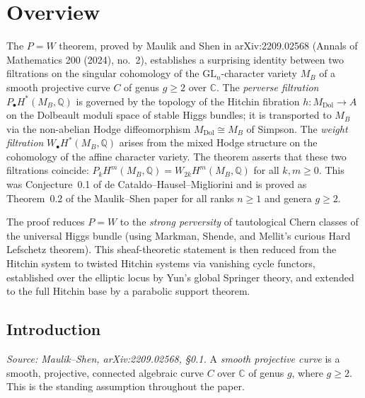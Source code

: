\chapter{Overview}
\label{chap:overview}


\providecommand{\git}{\mathbin{/\mkern-6mu/}}

The $P=W$ theorem, proved by Maulik and Shen in arXiv:2209.02568 (Annals of Mathematics 200
(2024), no.~2), establishes a surprising identity between two filtrations on the singular
cohomology of the $\mathrm{GL}_n$-character variety $M_B$ of a smooth projective curve $C$
of genus $g \geq 2$ over $\mathbb{C}$.  The \emph{perverse filtration}
$P_\bullet H^*(M_B, \mathbb{Q})$ is governed by the topology of the Hitchin fibration
$h \colon M_{\mathrm{Dol}} \to A$ on the Dolbeault moduli space of stable Higgs bundles; it
is transported to $M_B$ via the non-abelian Hodge diffeomorphism $M_{\mathrm{Dol}} \cong M_B$
of Simpson.  The \emph{weight filtration} $W_\bullet H^*(M_B, \mathbb{Q})$ arises from the
mixed Hodge structure on the cohomology of the affine character variety.  The theorem asserts
that these two filtrations coincide: $P_k H^m(M_B, \mathbb{Q}) = W_{2k} H^m(M_B, \mathbb{Q})$
for all $k, m \geq 0$.  This was Conjecture~0.1 of de Cataldo--Hausel--Migliorini and is
proved as Theorem~0.2 of the Maulik--Shen paper for all ranks $n \geq 1$ and genera $g \geq 2$.

The proof reduces $P=W$ to the \emph{strong perversity} of tautological Chern classes of the
universal Higgs bundle (using Markman, Shende, and Mellit's curious Hard Lefschetz theorem).
This sheaf-theoretic statement is then reduced from the Hitchin system to twisted Hitchin
systems via vanishing cycle functors, established over the elliptic locus by Yun's global
Springer theory, and extended to the full Hitchin base by a parabolic support theorem.

\section{Introduction}

\begin{definition}[SmoothProjectiveCurve]
  \label{def:smooth-projective-curve}
  \textit{Source: Maulik--Shen, arXiv:2209.02568, §0.1.}
  A \emph{smooth projective curve} is a smooth, projective, connected algebraic curve $C$
  over $\mathbb{C}$ of genus $g$, where $g \geq 2$.  This is the standing assumption
  throughout the paper.
\end{definition}

